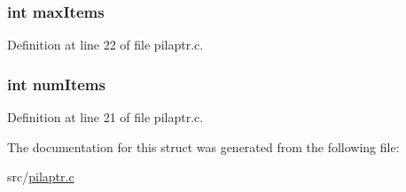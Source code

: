 \subsubsection[{max\+Items}]{\setlength{\rightskip}{0pt plus 5cm}int max\+Items}\label{struct_s_t___p_i_l_a___p_t_r_ab042caa09e8430028d87252ad6646a52}


Definition at line 22 of file pilaptr.\+c.

\hypertarget{struct_s_t___p_i_l_a___p_t_r_a1411ea3b26a34297217f0225315d9758}{}
\subsubsection[{num\+Items}]{\setlength{\rightskip}{0pt plus 5cm}int num\+Items}\label{struct_s_t___p_i_l_a___p_t_r_a1411ea3b26a34297217f0225315d9758}


Definition at line 21 of file pilaptr.\+c.



The documentation for this struct was generated from the following file\+:\begin{DoxyCompactItemize}
\item 
src/\hyperlink{pilaptr_8c}{pilaptr.\+c}\end{DoxyCompactItemize}

